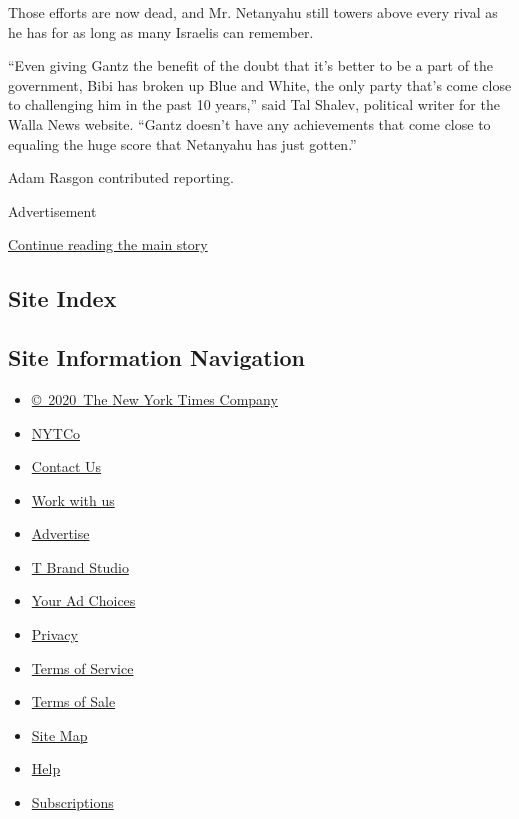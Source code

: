 Those efforts are now dead, and Mr. Netanyahu still towers above every
rival as he has for as long as many Israelis can remember.

``Even giving Gantz the benefit of the doubt that it's better to be a
part of the government, Bibi has broken up Blue and White, the only
party that's come close to challenging him in the past 10 years,'' said
Tal Shalev, political writer for the Walla News website. ``Gantz doesn't
have any achievements that come close to equaling the huge score that
Netanyahu has just gotten.''

Adam Rasgon contributed reporting.

Advertisement

\protect\hyperlink{after-bottom}{Continue reading the main story}

\hypertarget{site-index}{%
\subsection{Site Index}\label{site-index}}

\hypertarget{site-information-navigation}{%
\subsection{Site Information
Navigation}\label{site-information-navigation}}

\begin{itemize}
\tightlist
\item
  \href{https://help.nytimes.com/hc/en-us/articles/115014792127-Copyright-notice}{©~2020~The
  New York Times Company}
\end{itemize}

\begin{itemize}
\tightlist
\item
  \href{https://www.nytco.com/}{NYTCo}
\item
  \href{https://help.nytimes.com/hc/en-us/articles/115015385887-Contact-Us}{Contact
  Us}
\item
  \href{https://www.nytco.com/careers/}{Work with us}
\item
  \href{https://nytmediakit.com/}{Advertise}
\item
  \href{http://www.tbrandstudio.com/}{T Brand Studio}
\item
  \href{https://www.nytimes.com/privacy/cookie-policy\#how-do-i-manage-trackers}{Your
  Ad Choices}
\item
  \href{https://www.nytimes.com/privacy}{Privacy}
\item
  \href{https://help.nytimes.com/hc/en-us/articles/115014893428-Terms-of-service}{Terms
  of Service}
\item
  \href{https://help.nytimes.com/hc/en-us/articles/115014893968-Terms-of-sale}{Terms
  of Sale}
\item
  \href{https://spiderbites.nytimes.com}{Site Map}
\item
  \href{https://help.nytimes.com/hc/en-us}{Help}
\item
  \href{https://www.nytimes.com/subscription?campaignId=37WXW}{Subscriptions}
\end{itemize}
